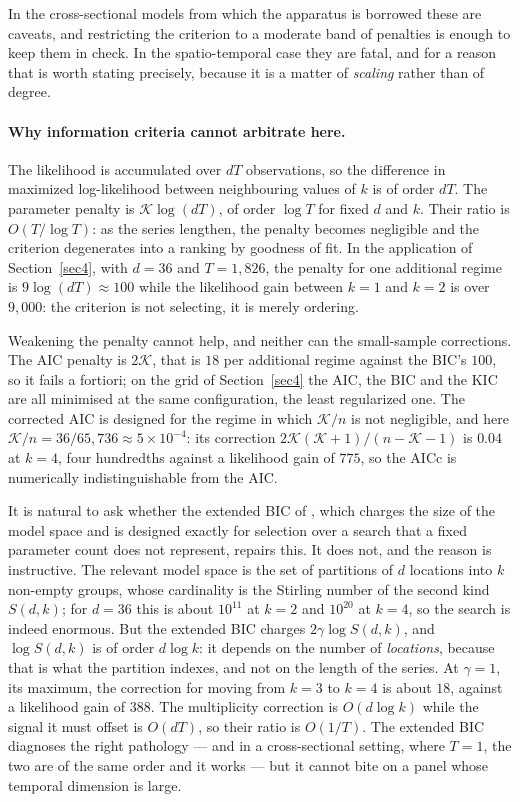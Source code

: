 In the cross-sectional models from which the apparatus is borrowed these are caveats, and restricting the criterion to a moderate band of penalties is enough to keep them in check. In the spatio-temporal case they are fatal, and for a reason that is worth stating precisely, because it is a matter of \emph{scaling} rather than of degree.

\paragraph{Why information criteria cannot arbitrate here.} The likelihood is accumulated over $dT$ observations, so the difference in maximized log-likelihood between neighbouring values of $k$ is of order $dT$. The parameter penalty is $\mathcal{K}\log(dT)$, of order $\log T$ for fixed $d$ and $k$. Their ratio is $O(T/\log T)$: as the series lengthen, the penalty becomes negligible and the criterion degenerates into a ranking by goodness of fit. In the application of Section~\ref{sec4}, with $d = 36$ and $T = 1{,}826$, the penalty for one additional regime is $9\log(dT) \approx 100$ while the likelihood gain between $k=1$ and $k=2$ is over $9{,}000$: the criterion is not selecting, it is merely ordering.

Weakening the penalty cannot help, and neither can the small-sample corrections. The AIC penalty is $2\mathcal{K}$, that is $18$ per additional regime against the BIC's $100$, so it fails a fortiori; on the grid of Section~\ref{sec4} the AIC, the BIC and the KIC are all minimised at the same configuration, the least regularized one. The corrected AIC is designed for the regime in which $\mathcal{K}/n$ is not negligible, and here $\mathcal{K}/n = 36/65{,}736 \approx 5 \times 10^{-4}$: its correction $2\mathcal{K}(\mathcal{K}+1)/(n - \mathcal{K} - 1)$ is $0.04$ at $k = 4$, four hundredths against a likelihood gain of $775$, so the AICc is numerically indistinguishable from the AIC.

It is natural to ask whether the extended BIC of \citet{ChenChen2008}, which charges the size of the model space and is designed exactly for selection over a search that a fixed parameter count does not represent, repairs this. It does not, and the reason is instructive. The relevant model space is the set of partitions of $d$ locations into $k$ non-empty groups, whose cardinality is the Stirling number of the second kind $S(d,k)$; for $d = 36$ this is about $10^{11}$ at $k = 2$ and $10^{20}$ at $k = 4$, so the search is indeed enormous. But the extended BIC charges $2\gamma \log S(d,k)$, and $\log S(d,k)$ is of order $d\log k$: it depends on the number of \emph{locations}, because that is what the partition indexes, and not on the length of the series. At $\gamma = 1$, its maximum, the correction for moving from $k=3$ to $k=4$ is about $18$, against a likelihood gain of $388$. The multiplicity correction is $O(d \log k)$ while the signal it must offset is $O(dT)$, so their ratio is $O(1/T)$. The extended BIC diagnoses the right pathology --- and in a cross-sectional setting, where $T = 1$, the two are of the same order and it works --- but it cannot bite on a panel whose temporal dimension is large.

